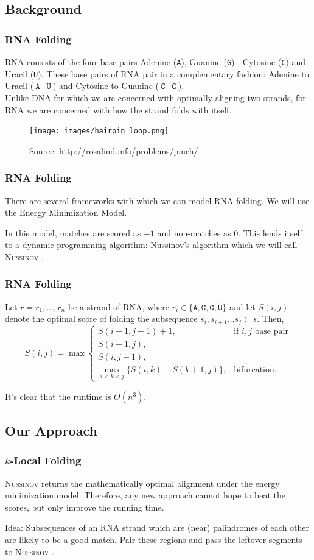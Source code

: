 \documentclass{beamer}
\title{\klf}
\subtitle{A Local Alignment Approach to RNA folding}
\author{Ben Chugg, Coulter Beeson, Kenny Drabble, Jeff Jeyachandren}
\institute{\textsc{The University of British Columbia}}
\date{April 6,2017}
\newcommand{\A}{\texttt{A}}
\newcommand{\G}{\texttt{G}}
\newcommand{\U}{\texttt{U}}
\newcommand{\C}{\texttt{C}}
\newcommand{\rf}{\textsc{Nussinov} }
\newcommand{\s}{\vspace{1cm}}
\begin{document}
\begin{frame}
\titlepage
\end{frame}


\begin{frame}
\section*{Background}
\frametitle{RNA Folding}
RNA consists of the four base pairs Adenine (\A), Guanine (\G) , Cytosine (\C) and Uracil (\U). These base pairs of RNA pair in a complementary fashion: Adenine to Uracil ($\A-\U$) and Cytosine to Guanine ($\C-\G$). \\

Unlike DNA for which we are concerned with optimally aligning two strands, for RNA we are concerned with how the strand folds with itself. 

\begin{figure}
\centering
\texttt{[image: images/hairpin\_loop.png]}
\vspace{-0.2cm}
\caption{Source: \url{http://rosalind.info/problems/pmch/}}
\end{figure}
\end{frame}

\begin{frame}
\frametitle{RNA Folding}
There are several frameworks with which we can model RNA folding. We will use the Energy Minimization Model. \s

In this model, matches are scored as $+1$ and non-matches as 0. This lends itself to a dynamic programming algorithm: Nussinov's algorithm which we will call \rf. 
\end{frame}

\begin{frame}
\frametitle{RNA Folding}
Let $r=r_1,\ldots,r_n$ be a strand of RNA, where $r_i\in\{\A,\C,\G,\U\}$ and let $S(i,j)$ denote the optimal score of folding the subsequence $s_i,s_{i+1}\ldots s_j\subset s$. Then, 
\[S(i,j)=\max\begin{cases}
S(i+1,j-1)+1,&\text{if }i,j\text{ base pair}\\
S(i+1,j),\\
S(i,j-1),\\
\displaystyle \max_{i<k<j}\{S(i,k)+S(k+1,j)\},&\text{bifurcation}.
\end{cases}\]

It's clear that the runtime is $O(n^3)$. 
\end{frame}


\begin{frame}
\section{Our Approach}
\frametitle{$k$-Local Folding}
\rf returns the mathematically optimal alignment under the energy minimization model. Therefore, any new approach cannot hope to beat the scores, but only improve the running time. \s

Idea: Subsequences of an RNA strand which are (near) palindromes of each other are likely to be a good match. Pair these regions and pass the leftover segments to \rf. 
\end{frame}
\end{document}
